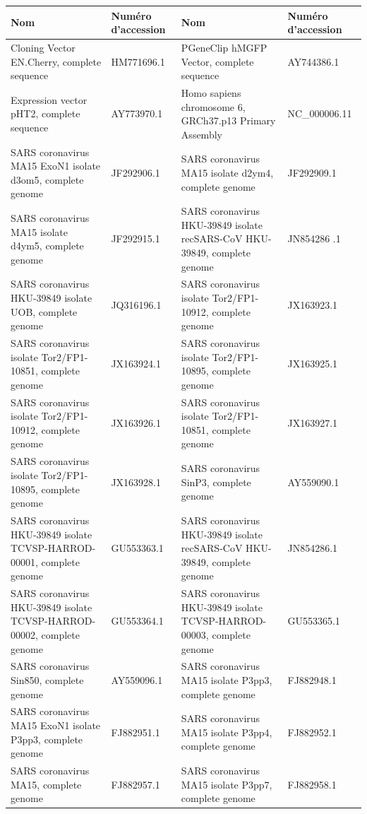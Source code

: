 \documentclass[10.8pt]{article} %
\begin{document}
 \footnotesize{
\begin{longtable}{|p{4.5cm}|p{3.5cm}|p{4.5cm}|p{3.5cm}|}
\hline
 Nom & Numéro d'accession & Nom & Numéro d'accession\\
 \hline \endhead
 Cloning Vector EN.Cherry, complete sequence & HM771696.1 & PGeneClip hMGFP Vector, complete sequence & AY744386.1 \\
 \hline
 Expression vector pHT2, complete sequence & AY773970.1 & Homo sapiens chromosome 6, GRCh37.p13 Primary Assembly & NC\_000006.11 \\
 \hline 
 SARS coronavirus MA15 ExoN1 isolate d3om5, complete genome & JF292906.1 & SARS coronavirus MA15 isolate d2ym4, complete genome & JF292909.1 \\
 \hline
  SARS coronavirus MA15 isolate d4ym5, complete genome & JF292915.1 & SARS coronavirus HKU-39849 isolate recSARS-CoV HKU-39849, 
  complete genome & JN854286 .1 \\
 \hline
   SARS coronavirus HKU-39849 isolate UOB, complete genome & JQ316196.1 & SARS coronavirus isolate Tor2/FP1-10912, complete genome & JX163923.1 \\
 \hline
 SARS coronavirus isolate Tor2/FP1-10851, complete genome & JX163924.1  & SARS coronavirus isolate Tor2/FP1-10895, complete genome & JX163925.1 \\
 \hline
  SARS coronavirus isolate Tor2/FP1-10912, complete genome & JX163926.1  & SARS coronavirus isolate Tor2/FP1-10851, complete genome & JX163927.1 \\
 \hline
   SARS coronavirus isolate Tor2/FP1-10895, complete genome & JX163928.1  & SARS coronavirus SinP3, complete genome & AY559090.1 \\
 \hline
  SARS coronavirus HKU-39849 isolate TCVSP-HARROD-00001, complete genome & GU553363.1  & SARS coronavirus HKU-39849 isolate recSARS-CoV HKU-39849, complete genome & JN854286.1 \\
 \hline
  SARS coronavirus HKU-39849 isolate TCVSP-HARROD-00002, complete genome & GU553364.1  & SARS coronavirus HKU-39849 isolate TCVSP-HARROD-00003, complete genome & GU553365.1 \\
 \hline
  SARS coronavirus Sin850, complete genome & AY559096.1  & SARS coronavirus MA15 isolate P3pp3, complete genome & FJ882948.1 \\
 \hline
  SARS coronavirus MA15 ExoN1 isolate P3pp3, complete genome & FJ882951.1  & SARS coronavirus MA15 isolate P3pp4, complete genome & FJ882952.1 \\
 \hline
  SARS coronavirus MA15, complete genome & FJ882957.1   & SARS coronavirus MA15 isolate P3pp7, complete genome & FJ882958.1 \\

\end{longtable}}
\end{document}
